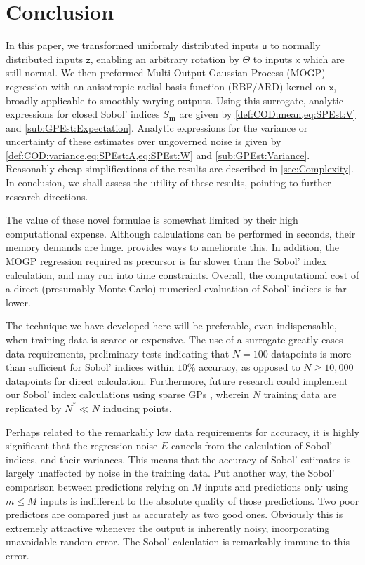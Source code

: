 \documentclass[preprint,12pt]{elsarticle}
\newcommand*{\mi}[1]{\mathbf{#1}}
\newcommand*{\rv}[1]{\mathsf{#1}}
\begin{document}
\section{Conclusion}\label{sec:Conc}
    In this paper, we transformed uniformly distributed inputs $\rv{u}$ to normally distributed inputs $\rv{z}$, enabling an arbitrary rotation by $\Theta$ to inputs $\rv{x}$ which are still normal. We then preformed Multi-Output Gaussian Process (MOGP) regression with an anisotropic radial basis function (RBF/ARD) kernel on $\rv{x}$, broadly applicable to smoothly varying outputs. Using this surrogate, analytic expressions for closed Sobol' indices $S_{\mi{m}}$ are given by \cref{def:COD:mean,eq:SPEst:V} and \cref{sub:GPEst:Expectation}. Analytic expressions for the variance or uncertainty of these estimates over ungoverned noise is given by \cref{def:COD:variance,eq:SPEst:A,eq:SPEst:W} and \cref{sub:GPEst:Variance}. Reasonably cheap simplifications of the results are described in \cref{sec:Complexity}.
    In conclusion, we shall assess the utility of these results, pointing to further research directions.

    The value of these novel formulae is somewhat limited by their high computational expense. Although calculations can be performed in seconds, their memory demands are huge.  provides ways to ameliorate this. In addition, the MOGP regression required as precursor is far slower than the Sobol' index calculation, and may run into time constraints. Overall, the computational cost of a direct (presumably Monte Carlo) numerical evaluation of Sobol' indices is far lower.

    The technique we have developed here will be preferable, even indispensable, when training data is scarce or expensive. The use of a surrogate greatly eases data requirements, preliminary tests indicating that $N=100$ datapoints is more than sufficient for Sobol' indices within $10\%$ accuracy, as opposed to $N\geq 10,000$ datapoints for direct calculation. Furthermore, future research could implement our Sobol' index calculations using sparse GPs \cite{Snelson.Ghahramani2006,titsias2009,Hensman2013}, wherein $N$ training data are replicated by $N^{*} \ll N$ inducing points.

    Perhaps related to the remarkably low data requirements for accuracy, it is highly significant that the regression noise $E$ cancels from the calculation of Sobol' indices, and their variances. This means that the accuracy of Sobol' estimates is largely unaffected by noise in the training data. Put another way, the Sobol' comparison between predictions relying on $M$ inputs and predictions only using $m \leq M$ inputs is indifferent to the absolute quality of those predictions. Two poor predictors are compared just as accurately as two good ones. Obviously this is extremely attractive whenever the output is inherently noisy, incorporating unavoidable random error. The Sobol' calculation is remarkably immune to this error.
\end{document}
